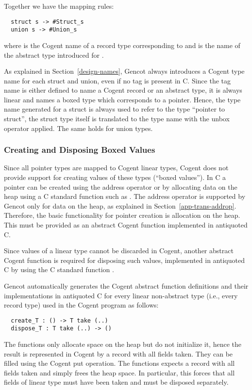 Together we have the mapping rules:
\begin{verbatim}
  struct s -> #Struct_s
  union s -> #Union_s
\end{verbatim}
where  is the Cogent name of a record type corresponding to  and  is the
name of the abstract type introduced for .

As explained in Section~\ref{design-names}, Gencot always introduces a Cogent type name for each struct and union,
even if no tag is present in C. Since the tag name is either defined to name a Cogent record or an abstract type,
it is always linear and names a boxed type which corresponds to a pointer. Hence, the type name generated for a struct
is always used to refer to the type ``pointer to struct'', the struct type itself is translated to the type name 
with the unbox operator applied. The same holds for union types.

\subsubsection{Creating and Disposing Boxed Values}

Since all pointer types are mapped to Cogent linear types, Cogent does not provide support for creating values
of these types (``boxed values''). In C a pointer can be created using the address operator \code{\&} or by allocating data on
the heap using a C standard function such as . The address operator is supported by Gencot
only for data on the heap, as explained in Section~\ref{app-trans-addrop}. Therefore, the basic functionality
for pointer creation is allocation on the heap. This must be provided as an abstract Cogent function implemented
in antiquoted C.

Since values of a linear type cannot be discarded in Cogent, another abstract Cogent function is required for
disposing such values, implemented in antiquoted C by using the C standard function .

Gencot automatically generates the Cogent abstract function definitions and their implementations in antiquoted
C for every linear non-abstract type  (i.e., every record type) used in the Cogent program as follows:
\begin{verbatim}
  create_T : () -> T take (..)
  dispose_T : T take (..) -> ()
\end{verbatim}
The  functions only allocate space on the heap but do not initialize it, hence the result is 
represented in Cogent by a record with all fields taken. They can be filled using the Cogent put operation.
The  functions expects a record with all fields taken and simply frees the heap space. In particular,
this forces that all fields of linear type must have been taken and must be disposed separately.


